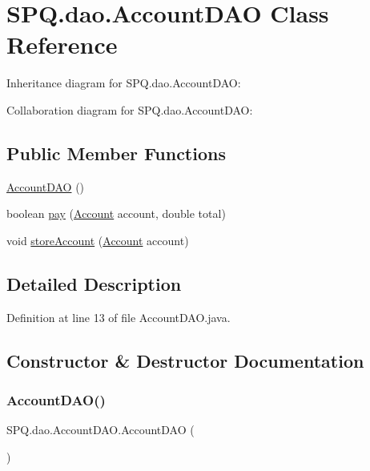 \hypertarget{class_s_p_q_1_1dao_1_1_account_d_a_o}{}\section{S\+P\+Q.\+dao.\+Account\+D\+AO Class Reference}
\label{class_s_p_q_1_1dao_1_1_account_d_a_o}


Inheritance diagram for S\+P\+Q.\+dao.\+Account\+D\+AO\+:


Collaboration diagram for S\+P\+Q.\+dao.\+Account\+D\+AO\+:
\subsection*{Public Member Functions}
\begin{DoxyCompactItemize}
\item 
\mbox{\hyperlink{class_s_p_q_1_1dao_1_1_account_d_a_o_a8de4c4bcd808ea5ea2b9fdbc741e49ea}{Account\+D\+AO}} ()
\item 
boolean \mbox{\hyperlink{class_s_p_q_1_1dao_1_1_account_d_a_o_ad40cd6129f180d4cb235c00756b53930}{pay}} (\mbox{\hyperlink{class_s_p_q_1_1data_1_1_account}{Account}} account, double total)
\item 
void \mbox{\hyperlink{class_s_p_q_1_1dao_1_1_account_d_a_o_abe750b9b11a2c7d398c4d8676b053f99}{store\+Account}} (\mbox{\hyperlink{class_s_p_q_1_1data_1_1_account}{Account}} account)
\end{DoxyCompactItemize}


\subsection{Detailed Description}


Definition at line 13 of file Account\+D\+A\+O.\+java.



\subsection{Constructor \& Destructor Documentation}
\mbox{\label{class_s_p_q_1_1dao_1_1_account_d_a_o_a8de4c4bcd808ea5ea2b9fdbc741e49ea}} 
\subsubsection{\texorpdfstring{Account\+D\+A\+O()}{AccountDAO()}}
{\footnotesize\ttfamily S\+P\+Q.\+dao.\+Account\+D\+A\+O.\+Account\+D\+AO (\begin{DoxyParamCaption}{ }\end{DoxyParamCaption})}



